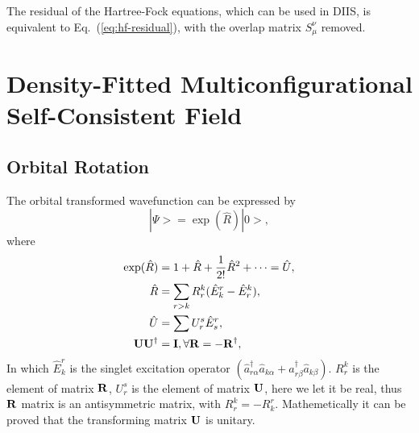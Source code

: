 \documentclass[a4paper,12pt,oneside]{book}
\newcommand{\eq}[1]{Eq.~(\ref{#1})}
\begin{document}
The residual of the Hartree-Fock equations, which can be used in DIIS, is equivalent to
\eq{eq:hf-residual}, with the overlap matrix $S_{\mu}^{\nu}$ removed.

\chapter{Density-Fitted Multiconfigurational Self-Consistent Field}
\section{Orbital Rotation}
The orbital transformed wavefunction can be expressed by
\begin{equation}
  |\Psi> = \exp(\hat{R})|0>,
\end{equation}
where
\begin{equation}
\begin{aligned}
  \exp(\hat{R}) &= 1+\hat{R}+\frac{1}{2!}\hat{R}^2+ \cdots=\hat{U}, \\
  \hat{R} &= \sum_{r\mathchar"313E k}R_r^k(\hat{E}_k^r-\hat{E}_r^k), \\
  \hat{U} &= \sum U_r^s\hat{E}_s^r, \\
  \bf{U} \bf{U}^\dagger &= \bf{I}, \forall  \bf{R}=-\bf{R}^{\dagger},\\
\end{aligned}
\end{equation}
In which $\hat{E}_k^r$ is the singlet excitation operator $(\hat{a}_{r\alpha}^{\dagger}\hat{a}_{k\alpha}+\hat{a}_{r\beta}^{\dagger}\hat{a}_{k\beta} )$. 
$R_r^k$ is the element of matrix $\bf{R}$, $U_r^s$ is the element of matrix $\bf{U}$, 
here we let it be real, thus $\bf{R}$ matrix is an antisymmetric matrix, with $R_r^k=-R_k^r$. 
Mathemetically it can be proved that the transforming matrix $\bf{U}$ is unitary.
\end{document}
